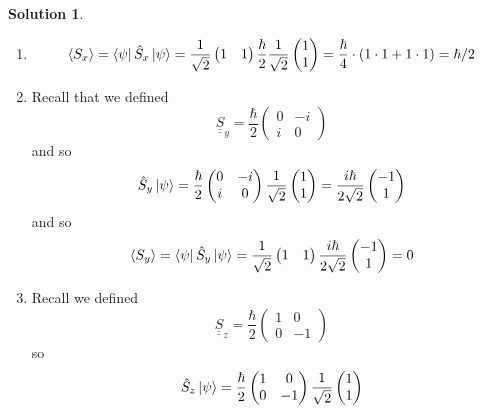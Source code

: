 \documentclass[10pt]{article}
\theoremstyle{definition}
\newtheorem{soln}{Solution}
\newcommand{\dul}[1]{\underline{\underline{#1}}}
\begin{document}
\begin{soln}
\begin{enumerate}[label=(\alph*)]
    \item $$\langle S_x\rangle=\bra{\psi}\hat{S}_x\ket{\psi}=\frac{1}{\sqrt{2}}\begin{pmatrix}
              1 &1
            \end{pmatrix}\frac{\hbar}{2}\frac{1}{\sqrt{2}}\begin{pmatrix}
              1 \\1
            \end{pmatrix}=\frac{\hbar}{4}\cdot (1\cdot 1 +1\cdot 1)=\hbar/2
            $$
    \item Recall that we defined $$\dul{S}_y=\frac{\hbar}{2}\begin{pmatrix}
      0 & -i\\
      i & 0
    \end{pmatrix}$$
    and so $$\hat{S}_y\ket{\psi}=\frac{\hbar}{2}\begin{pmatrix}
      0 & -i\\
      i & 0
    \end{pmatrix}\frac{1}{\sqrt{2}}\begin{pmatrix}
              1 \\1
            \end{pmatrix}=\frac{i\hbar}{2\sqrt{2}}\begin{pmatrix}
              -1\\1
            \end{pmatrix}$$
            and so 
            $$\langle S_y\rangle=\bra{\psi}\hat{S}_y\ket{\psi}=\frac{1}{\sqrt{2}}\begin{pmatrix}
              1 &1
            \end{pmatrix}\frac{i\hbar}{2\sqrt{2}}\begin{pmatrix}
              -1\\1
            \end{pmatrix}=0$$
    \item Recall we defined 
            $$\dul{S}_z=\frac{\hbar}{2}\begin{pmatrix}
              1 & 0 \\
              0 & -1
            \end{pmatrix}$$
            so
            $$\hat{S}_z\ket{\psi}=\frac{\hbar}{2}\begin{pmatrix}
              1 & 0 \\
              0 & -1
            \end{pmatrix}\frac{1}{\sqrt{2}}\begin{pmatrix}
              1 \\1

\end{pmatrix}$$
\end{enumerate}
\end{soln}
\end{document}
